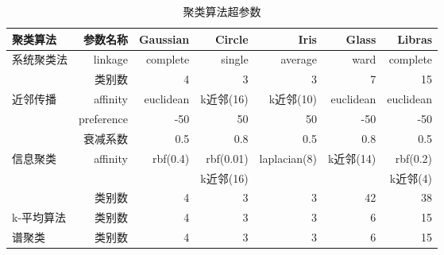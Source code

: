 \begin{table}[!ht]
  \centering
\begin{tabular}{|l|r|r|r|r|r|r|}
  \hline
   聚类算法  &   参数名称 & Gaussian &   Circle &   Iris &   Glass &   Libras \\
  \hline
   \multirow{2}{*}{系统聚类法}  &  linkage     &   complete&     single &   average
   & ward &   complete \\
   \cline{2-7}
   & 类别数 & 4 & 3 & 3 & 7 & 15 \\
   \hline
   \multirow{3}{*}{近邻传播}  &    affinity & euclidean &  k近邻(16)
   &  k近邻(10)
   & euclidean &   euclidean \\
   \cline{2-7}
   & preference & -50 & 50 & 50 &
   -50 & -50\\
   \cline{2-7}
   & 衰减系数 & 0.5 & 0.8 & 0.5 & 0.8 & 0.5 \\
   \hline
   \multirow{2}{*}{信息聚类}  & 
   \multirow{2}{*}{affinity}      &       rbf(0.4) &    rbf(0.01)&  laplacian(8) & k近邻(14) &   rbf(0.2) \\
   & & &  k近邻(16)  & && k近邻(4)\\
   \cline{2-7}
   & 类别数 & 4 & 3 & 3 & 42 & 38\\
   \hline
   k-平均算法     &     类别数    &
   4 &    3 &  3 &   6 &    15 \\
   \hline
   谱聚类   &    类别数 & 4 &   3 &    3 &   6 &    15 \\
  \hline
\end{tabular}
\caption{聚类算法超参数}\label{tab:clustering_alg_hyperparameter}
\end{table}

